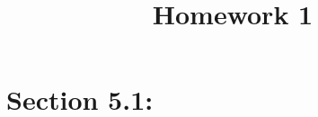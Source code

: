 \documentclass{article}
\begin{document}
\title{Homework 1}
\maketitle
\thispagestyle{fancy}

\section*{Section 5.1: }
\end{document}
